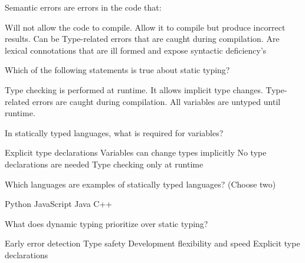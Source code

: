 \documentclass[12pt, addpoints, answers]{exam}
\begin{document}
\begin{questions}
	\question Semantic errors are errors in the code that:
 	\begin{choices}
		\choice Will not allow the code to compile.
		\CorrectChoice Allow it to compile but produce incorrect results.
		\choice Can be Type-related errors that are caught during compilation.
		\choice Are lexical connotations that are ill formed and expose syntactic deficiency's
	\end{choices}

 
	\question Which of the following statements is true about static typing?
	\begin{choices}
		\choice Type checking is performed at runtime.
		\choice It allows implicit type changes.
		\CorrectChoice Type-related errors are caught during compilation.
		\choice All variables are untyped until runtime.
	\end{choices}
				
	\question In statically typed languages, what is required for variables?
	\begin{choices}
		\CorrectChoice Explicit type declarations
		\choice Variables can change types implicitly
		\choice No type declarations are needed
		\choice Type checking only at runtime
	\end{choices}
				
	\question Which languages are examples of statically typed languages? (Choose two)
	\begin{choices}
		\choice Python
		\choice JavaScript
		\CorrectChoice Java
		\CorrectChoice C++
	\end{choices}

        \newpage 
				
	\question What does dynamic typing prioritize over static typing?
	\begin{choices}
		\choice Early error detection
		\choice Type safety
		\CorrectChoice Development flexibility and speed
		\choice Explicit type declarations
	\end{choices}
				


\end{questions}
\end{document}
